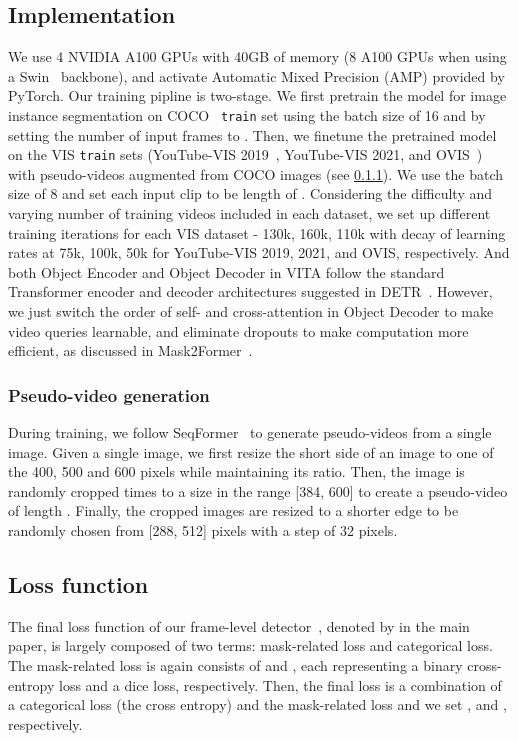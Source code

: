 \documentclass{article}
\begin{document}
\subsection{Implementation}
We use 4 NVIDIA A100 GPUs with 40GB of memory (8 A100 GPUs when using a Swin~\cite{Swin} backbone), and activate Automatic Mixed Precision (AMP) provided by PyTorch.
Our training pipline is two-stage.
We first pretrain the model for image instance segmentation on COCO~\cite{COCO} \texttt{train} set using the batch size of 16 and by setting the number of input frames to .
Then, we finetune the pretrained model on the VIS \texttt{train} sets (YouTube-VIS 2019~\cite{MaskTrackRCNN}, YouTube-VIS 2021, and  OVIS~\cite{OVIS-Dataset}) with pseudo-videos augmented from COCO images (see \cref{supp:pseudo-video}).
We use the batch size of 8 and set each input clip to be length of .
Considering the difficulty and varying number of training videos included in each dataset, we set up different training iterations for each VIS dataset - 130k, 160k, 110k with decay of learning rates at 75k, 100k, 50k for YouTube-VIS 2019, 2021, and OVIS, respectively.
And both Object Encoder and Object Decoder in VITA follow the standard Transformer encoder and decoder architectures suggested in DETR~\cite{DETR}.
However, we just switch the order of self- and cross-attention in Object Decoder to make video queries learnable, and eliminate dropouts to make computation more efficient, as discussed in Mask2Former~\cite{Mask2Former}.


\subsubsection{Pseudo-video generation}
\label{supp:pseudo-video}
During training, we follow SeqFormer~\cite{SeqFormer} to generate pseudo-videos from a single image.
Given a single image, we first resize the short side of an image to one of the 400, 500 and 600 pixels while maintaining its ratio.
Then, the image is randomly cropped  times to a size in the range [384, 600] to create a pseudo-video of length .
Finally, the cropped images are resized to a shorter edge to be randomly chosen from [288, 512] pixels with a step of 32 pixels.

\subsection{Loss function}
\label{supp:loss}
The final loss function of our frame-level detector~\cite{Mask2Former}, denoted by  in the main paper, is largely composed of two terms: mask-related loss and categorical loss.
The mask-related loss is again consists of  and , each representing a binary cross-entropy loss and a dice loss, respectively.
Then, the final loss  is a combination of a categorical loss (the cross entropy) and the mask-related loss  and we set , and , respectively.
\end{document}
